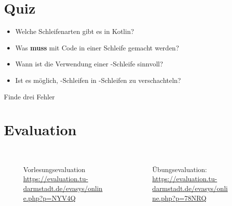 \section{Quiz}
\begin{frame}
    \slidehead
    \pause
    \begin{itemize}
        \item Welche Schleifenarten gibt es in Kotlin?\pause
        \item Was \textbf{muss} mit Code in einer Schleife gemacht werden?\pause
        \item Wann ist die Verwendung einer -Schleife sinnvoll?\pause
        \item Ist es möglich, -Schleifen in -Schleifen zu verschachteln?\pause
    \end{itemize}
    \begin{block}{Finde drei Fehler}
    \end{block}
\end{frame}

\section{Evaluation}
\begin{frame}
    \slidehead
    \begin{columns}
        \begin{column}{6cm}
            \vspace{-0.5cm}
            \begin{figure}
                \centering
                \\  \sffamily \tiny Vorlesungsevaluation \href{https://evaluation.tu-darmstadt.de/evasys/online.php?p=NYV4Q}{https://evaluation.tu-darmstadt.de/evasys/online.php?p=NYV4Q}
            \end{figure}
        \end{column}
        \begin{column}{6cm}
            \vspace{-0.5cm}
            \begin{figure}
                \centering
                \\  \sffamily \tiny Übungsevaluation: \href{https://evaluation.tu-darmstadt.de/evasys/online.php?p=78NRQ}{https://evaluation.tu-darmstadt.de/evasys/online.php?p=78NRQ}
            \end{figure}
        \end{column}
    \end{columns}
\end{frame}





